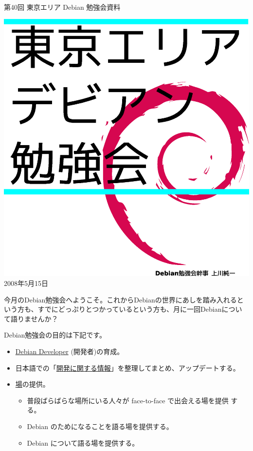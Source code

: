 \documentclass[mingoth,a4paper]{jsarticle}
\newcommand{\debmtgyear}{2008}
\newcommand{\debmtgmonth}{5}
\newcommand{\debmtgdate}{15}
\newcommand{\debmtgnumber}{40}
\begin{document}
\begin{titlepage}
\thispagestyle{empty}


\vspace*{-2cm}
第\debmtgnumber{}回 東京エリア Debian 勉強会資料

\hspace*{-2.4cm}
\includegraphics[width=210mm]{image200801/2008title.eps}\\
\hfill{}\debmtgyear{}年\debmtgmonth{}月\debmtgdate{}日

\end{titlepage}

 
 今月のDebian勉強会へようこそ。これからDebianの世界にあしを踏み入れると
 いう方も、すでにどっぷりとつかっているという方も、月に一回Debianについ
 て語りませんか？

 Debian勉強会の目的は下記です。

\begin{itemize}
 \item \underline{Debian Developer} (開発者)の育成。
 \item 日本語での「\underline{開発に関する情報}」を整理してまとめ、アップデートする。
 \item \underline{場}の提供。
 \begin{itemize}
  \item 普段ばらばらな場所にいる人々が face-to-face で出会える場を提供
	する。
  \item Debian のためになることを語る場を提供する。
  \item Debian について語る場を提供する。
 \end{itemize}
\end{itemize}		
\end{document}
